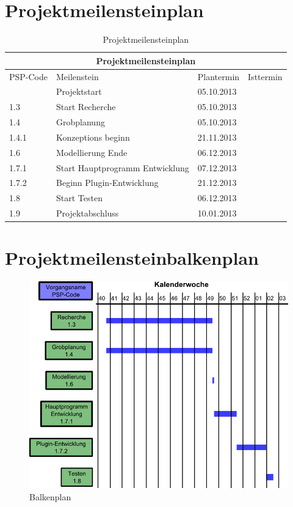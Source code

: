 \newcommand*{\thead}[1]{\multicolumn{4}{|c|}{\bfseries #1}}

\section{Projektmeilensteinplan}
\begin{table}[!h]
\caption{Projektmeilensteinplan}
\centering
\begin{tabular}{|l|l|l|l|}
\hline
\thead{Projektmeilensteinplan} \\
\hline
\hline
PSP-Code & Meilenstein & Plantermin & Isttermin \\ [1ex]
\hline
& Projektstart & 05.10.2013 & \\
\hline
1.3 & Start Recherche & 05.10.2013 & \\
\hline
1.4 & Grobplanung & 05.10.2013 & \\
\hline
1.4.1 & Konzeptions beginn & 21.11.2013 & \\
\hline
1.6 & Modellierung Ende & 06.12.2013 & \\
\hline
1.7.1 & Start Hauptprogramm Entwicklung & 07.12.2013 & \\
\hline
1.7.2 & Beginn Plugin-Entwicklung & 21.12.2013 & \\
\hline
1.8  & Start Testen & 06.12.2013 & \\
\hline
1.9 & Projektabschluss & 10.01.2013 & \\
\hline
\end{tabular}
\end{table}

\section{Projektmeilensteinbalkenplan}
\begin{figure}[!ht]
\includegraphics[width=\textwidth, height=\textheight, keepaspectratio, angle=0]{images/balkenplan}
\caption{Balkenplan}
\end{figure}
